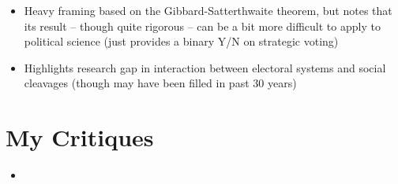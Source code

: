 \documentclass[12pt]{article}
\begin{document}
\begin{itemize}
    \item Heavy framing based on the Gibbard-Satterthwaite theorem, but notes that its result -- though quite rigorous -- can be a bit more difficult to apply to political science (just provides a binary Y/N on strategic voting)
    \item Highlights research gap in interaction between electoral systems and social cleavages (though may have been filled in past 30 years)
\end{itemize}


\section{My Critiques}

\begin{itemize}
    \item
\end{itemize}
\end{document}
